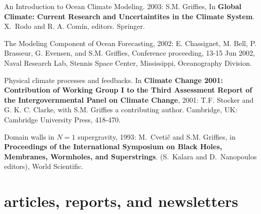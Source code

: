 \begin{etaremune}
\item An Introduction to Ocean Climate Modeling.  2003: S.M. Grif\/f\/ies, In {\bf Global Climate: Current Research and Uncertaintites in the Climate System}. X.\ Rodo and R. A. Com\'in, editors.  Springer.

\item The Modeling Component of Ocean Forecasting, 2002:
E. Chassignet, M. Bell, P. Brasseur, G. Evensen, and S.M. Grif\/f\/ies, Conference proceeding, 13-15 Jun 2002, Naval
Research Lab, Stennis Space Center, Mississippi, Oceanography Division.

\item Physical climate processes and feedbacks. In {\bf Climate Change 2001: Contribution of Working Group I to the Third Assessment Report of the Intergovernmental Panel on Climate Change}, 2001: T.F. Stocker and G. K. C. Clarke, with S.M. Grif\/f\/ies a contributing author.  Cambridge, UK: Cambridge University Press, 418-470.

\item Domain walls in $N=1$ supergravity, 1993: M.\ Cveti\v c and S.M. Grif\/f\/ies, in {\bf Proceedings of the International Symposium on Black Holes, Membranes, Wormholes, and Superstrings}. (S.\ Kalara and D.\ Nanopoulos editors), World Scientific.

\end{etaremune}

\section*{\sc \color{Maroon} articles, reports, and newsletters}

